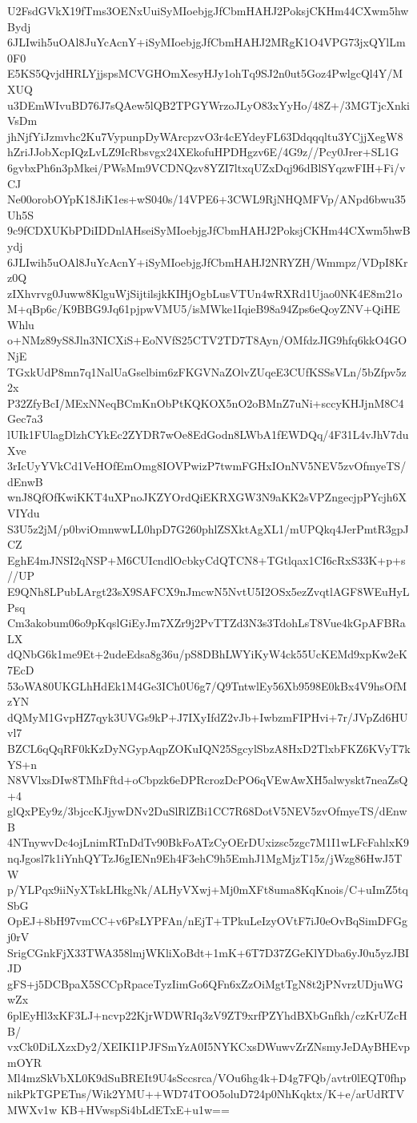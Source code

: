 U2FsdGVkX19fTms3OENxUuiSyMIoebjgJfCbmHAHJ2PoksjCKHm44CXwm5hwBydj
6JLIwih5uOAl8JuYcAcnY+iSyMIoebjgJfCbmHAHJ2MRgK1O4VPG73jxQYlLm0F0
E5KS5QvjdHRLYjjspsMCVGHOmXesyHJy1ohTq9SJ2n0ut5Goz4PwlgcQl4Y/MXUQ
u3DEmWIvuBD76J7sQAew5lQB2TPGYWrzoJLyO83xYyHo/48Z+/3MGTjcXnkiVsDm
jhNjfYiJzmvhc2Ku7VypunpDyWArcpzvO3r4cEYdeyFL63Ddqqqltu3YCjjXegW8
hZriJJobXcpIQzLvLZ9IcRbsvgx24XEkofuHPDHgzv6E/4G9z//Pcy0Jrer+SL1G
6gvbxPh6n3pMkei/PWsMm9VCDNQzv8YZI7ltxqUZxDqj96dBlSYqzwFIH+Fi/vCJ
Ne00orobOYpK18JiK1es+wS040s/14VPE6+3CWL9RjNHQMFVp/ANpd6bwu35Uh5S
9c9fCDXUKbPDiIDDnlAHseiSyMIoebjgJfCbmHAHJ2PoksjCKHm44CXwm5hwBydj
6JLIwih5uOAl8JuYcAcnY+iSyMIoebjgJfCbmHAHJ2NRYZH/Wmmpz/VDpI8Krz0Q
zIXhvrvg0Juww8KlguWjSijtilsjkKIHjOgbLusVTUn4wRXRd1Ujao0NK4E8m21o
M+qBp6c/K9BBG9Jq61pjpwVMU5/isMWke1IqieB98a94Zps6eQoyZNV+QiHEWhlu
o+NMz89yS8Jln3NICXiS+EoNVfS25CTV2TD7T8Ayn/OMfdzJIG9hfq6kkO4GONjE
TGxkUdP8mn7q1NalUaGselbim6zFKGVNaZOlvZUqeE3CUfKSSsVLn/5bZfpv5z2x
P32ZfyBcI/MExNNeqBCmKnObPtKQKOX5nO2oBMnZ7uNi+sccyKHJjnM8C4Gec7a3
lUIk1FUlagDlzhCYkEc2ZYDR7wOe8EdGodn8LWbA1fEWDQq/4F31L4vJhV7duXve
3rIcUyYVkCd1VeHOfEmOmg8IOVPwizP7twmFGHxIOnNV5NEV5zvOfmyeTS/dEnwB
wnJ8QfOfKwiKKT4uXPnoJKZYOrdQiEKRXGW3N9aKK2sVPZngecjpPYcjh6XVIYdu
S3U5z2jM/p0bviOmnwwLL0hpD7G260phlZSXktAgXL1/mUPQkq4JerPmtR3gpJCZ
EghE4mJNSI2qNSP+M6CUIcndlOcbkyCdQTCN8+TGtlqax1CI6cRxS33K+p+s//UP
E9QNh8LPubLArgt23sX9SAFCX9nJmcwN5NvtU5I2OSx5ezZvqtlAGF8WEuHyLPsq
Cm3akobum06o9pKqslGiEyJm7XZr9j2PvTTZd3N3s3TdohLsT8Vue4kGpAFBRaLX
dQNbG6k1me9Et+2udeEdsa8g36u/pS8DBhLWYiKyW4ck55UcKEMd9xpKw2eK7EcD
53oWA80UKGLhHdEk1M4Ge3ICh0U6g7/Q9TntwlEy56Xb9598E0kBx4V9hsOfMzYN
dQMyM1GvpHZ7qyk3UVGs9kP+J7IXyIfdZ2vJb+IwbzmFIPHvi+7r/JVpZd6HUvl7
BZCL6qQqRF0kKzDyNGypAqpZOKuIQN25SgcylSbzA8HxD2TlxbFKZ6KVyT7kYS+n
N8VVlxsDIw8TMhFftd+oCbpzk6eDPRcrozDcPO6qVEwAwXH5alwyskt7neaZsQ+4
glQxPEy9z/3bjccKJjywDNv2DuSlRlZBi1CC7R68DotV5NEV5zvOfmyeTS/dEnwB
4NTnywvDc4ojLnimRTnDdTv90BkFoATzCyOErDUxizsc5zgc7M1I1wLFcFahlxK9
nqJgosl7k1iYnhQYTzJ6gIENn9Eh4F3ehC9h5EmhJ1MgMjzT15z/jWzg86HwJ5TW
p/YLPqx9iiNyXTskLHkgNk/ALHyVXwj+Mj0mXFt8uma8KqKnois/C+uImZ5tqSbG
OpEJ+8bH97vmCC+v6PsLYPFAn/nEjT+TPkuLeIzyOVtF7iJ0eOvBqSimDFGgj0rV
SrigCGnkFjX33TWA358lmjWKliXoBdt+1mK+6T7D37ZGeKlYDba6yJ0u5yzJBIJD
gFS+j5DCBpaX5SCCpRpaceTyzIimGo6QFn6xZzOiMgtTgN8t2jPNvrzUDjuWGwZx
6plEyHl3xKF3LJ+ncvp22KjrWDWRIq3zV9ZT9xrfPZYhdBXbGnfkh/czKrUZcHB/
vxCk0DiLXzxDy2/XEIKI1PJFSmYzA0I5NYKCxsDWuwvZrZNsmyJeDAyBHEvpmOYR
Ml4mzSkVbXL0K9dSuBREIt9U4sSccsrca/VOu6hg4k+D4g7FQb/avtr0lEQT0fhp
nikPkTGPETns/Wik2YMU++WD74TOO5oluD724p0NhKqktx/K+e/arUdRTVMWXv1w
KB+HVwspSi4bLdETxE+u1w==
